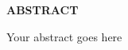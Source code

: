 \providecommand\phantomsection{} \phantomsection
\thispagestyle{plain}
\begin{center}
\providecommand\pdfbookmark[3][]{} \pdfbookmark[0]{Abstract}{bm:Abstract}
\textbf{ABSTRACT}\\[2\baselineskip]
\end{center}

Your abstract goes here
